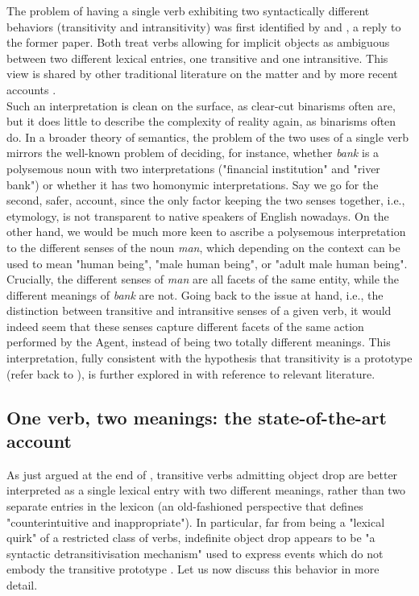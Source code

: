 The problem of having a single verb exhibiting two syntactically different behaviors (transitivity and intransitivity) was first identified by \textcite{fodor1980functional} and \textcite{dowty1981quantification}, a reply to the former paper. Both treat verbs allowing for implicit objects as ambiguous between two different lexical entries, one transitive and one intransitive. This view is shared by other traditional literature on the matter \parencite{Cote1996, Mittwoch1982, vanvalinlapolla1997syntax, brisson1994licensing, FellbaumKegl1989taxonomic} and by more recent accounts \parencite{PethoKardos2006, BourmayanRecanati2013}.\\
Such an interpretation is clean on the surface, as clear-cut binarisms often are, but it does little to describe the complexity of reality \textemdash again, as binarisms often do. In a broader theory of semantics, the problem of the two uses of a single verb mirrors the well-known problem of deciding, for instance, whether \textit{bank} is a polysemous noun with two interpretations ("financial institution" and "river bank") or whether it has two homonymic interpretations. Say we go for the second, safer, account, since the only factor keeping the two senses together, i.e., etymology, is not transparent to native speakers of English nowadays. On the other hand, we would be much more keen to ascribe a polysemous interpretation to the different senses of the noun \textit{man}, which depending on the context can be used to mean "human being", "male human being", or "adult male human being". Crucially, the different senses of \textit{man} are all facets of the same entity, while the different meanings of \textit{bank} are not. Going back to the issue at hand, i.e., the distinction between transitive and intransitive senses of a given verb, it would indeed seem that these senses capture different facets of the same action performed by the Agent, instead of being two totally different meanings. This interpretation, fully consistent with the hypothesis that transitivity is a prototype (refer back to ), is further explored in  with reference to relevant literature.


\subsection{One verb, two meanings: the state-of-the-art account} 

As just argued at the end of , transitive verbs admitting object drop are better interpreted as a single lexical entry with two different meanings, rather than two separate entries in the lexicon (an old-fashioned perspective that \textcite[60]{Lorenzetti2008} defines "counterintuitive and inappropriate"). In particular, far from being a "lexical quirk" of a restricted class of verbs, indefinite object drop appears to be "a syntactic detransitivisation mechanism" used to express events which do not embody the transitive prototype \parencite[134]{Naess2007}. Let us now discuss this behavior in more detail.

